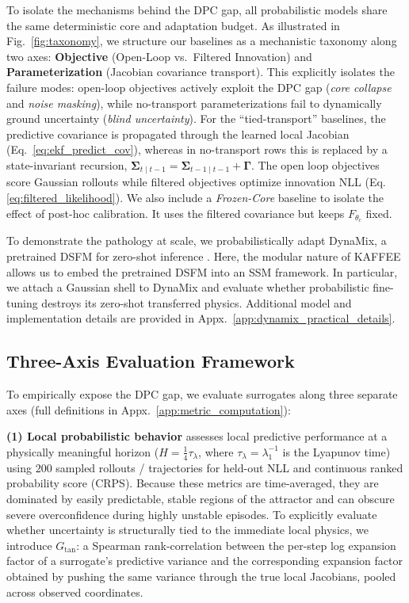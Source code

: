 \documentclass{article}
\theoremstyle{plain}
\theoremstyle{definition}
\theoremstyle{remark}
\begin{document}
To isolate the mechanisms behind the DPC gap, all probabilistic models share the same deterministic core and adaptation budget. As illustrated in Fig.~\ref{fig:taxonomy}, we structure our baselines as a mechanistic taxonomy along two axes: \textbf{Objective} (Open-Loop vs.\ Filtered Innovation) and \textbf{Parameterization} (Jacobian covariance transport). This explicitly isolates the failure modes: open-loop objectives actively exploit the DPC gap (\emph{core collapse} and \emph{noise masking}), while no-transport parameterizations fail to dynamically ground uncertainty (\emph{blind uncertainty}). For the ``tied-transport'' baselines, the predictive covariance is propagated through the learned local Jacobian (Eq.~\ref{eq:ekf_predict_cov}), whereas in no-transport rows this is replaced by a state-invariant recursion, $\bm\Sigma_{t\mid t-1}=\bm\Sigma_{t-1\mid t-1}+\bm\Gamma$. The open loop objectives score Gaussian rollouts while filtered objectives optimize innovation NLL (Eq. \ref{eq:filtered_likelihood}). We also include a \emph{Frozen-Core} baseline to isolate the effect of post-hoc calibration. It uses the filtered covariance but keeps $F_{\theta_c}$ fixed.

To demonstrate the pathology at scale, we probabilistically adapt DynaMix, a pretrained DSFM for zero-shot inference \citep{hemmer2025true}. Here, the modular nature of KAFFEE allows us to embed the pretrained DSFM into an SSM framework. In particular, we attach a Gaussian shell to DynaMix  and evaluate whether probabilistic fine-tuning destroys its zero-shot transferred physics. Additional model and implementation details 
are provided in Appx.~\ref{app:dynamix_practical_details}.

\subsection{Three-Axis Evaluation Framework}
\label{subsec:eval-framework}

To empirically expose the DPC gap, we evaluate surrogates along three separate axes (full definitions in Appx.~\ref{app:metric_computation}):

\textbf{(1) Local probabilistic behavior} assesses local predictive performance at a physically meaningful horizon ($H=\tfrac14\tau_\lambda$, where $\tau_\lambda = \lambda_1^{-1}$ is the Lyapunov time) using $200$ sampled rollouts / trajectories for held-out NLL and continuous ranked probability score (CRPS). Because these metrics are time-averaged, they are dominated by easily predictable, stable regions of the attractor and can obscure severe overconfidence during highly unstable episodes. To explicitly evaluate whether uncertainty is structurally tied to the immediate local physics, we introduce $G_{\mathrm{tan}}$: a Spearman rank-correlation between the per-step log expansion factor of a surrogate's predictive variance and the corresponding expansion factor obtained by pushing the same variance through the true local Jacobians, pooled across observed coordinates.
\end{document}
